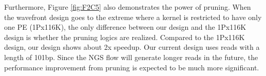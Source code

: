 Furthermore, Figure \ref{fig:F2C5} also demonstrates the power of pruning. 
When the wavefront design goes to the extreme where a kernel is restricted to have only one PE (1Px116K), 
the only difference between our design and the 1Px116K design is whether the pruning logics are realized. 
Compared to the 1Px116K design, our design shows about 2x speedup.
Our current design uses reads with a length of 101bp.
Since the NGS flow will generate longer reads in the future, the performance improvement from pruning is expected to be much more significant.
